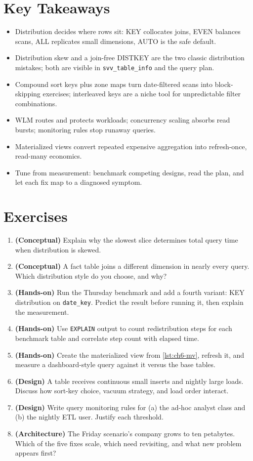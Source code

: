 \section*{Key Takeaways}
\begin{itemize}
    \item Distribution decides where rows sit: KEY collocates joins, EVEN balances scans, ALL replicates small dimensions, AUTO is the safe default.
    \item Distribution skew and a join-free DISTKEY are the two classic distribution mistakes; both are visible in \texttt{svv\_table\_info} and the query plan.
    \item Compound sort keys plus zone maps turn date-filtered scans into block-skipping exercises; interleaved keys are a niche tool for unpredictable filter combinations.
    \item WLM routes and protects workloads; concurrency scaling absorbs read bursts; monitoring rules stop runaway queries.
    \item Materialized views convert repeated expensive aggregation into refresh-once, read-many economics.
    \item Tune from measurement: benchmark competing designs, read the plan, and let each fix map to a diagnosed symptom.
\end{itemize}

\section{Exercises}
\begin{enumerate}
    \item \textbf{(Conceptual)} Explain why the slowest slice determines total query time when distribution is skewed.
    \item \textbf{(Conceptual)} A fact table joins a different dimension in nearly every query. Which distribution style do you choose, and why?
    \item \textbf{(Hands-on)} Run the Thursday benchmark and add a fourth variant: KEY distribution on \texttt{date\_key}. Predict the result before running it, then explain the measurement.
    \item \textbf{(Hands-on)} Use \texttt{EXPLAIN} output to count redistribution steps for each benchmark table and correlate step count with elapsed time.
    \item \textbf{(Hands-on)} Create the materialized view from \cref{lst:ch6-mv}, refresh it, and measure a dashboard-style query against it versus the base tables.
    \item \textbf{(Design)} A table receives continuous small inserts and nightly large loads. Discuss how sort-key choice, vacuum strategy, and load order interact.
    \item \textbf{(Design)} Write query monitoring rules for (a) the ad-hoc analyst class and (b) the nightly ETL user. Justify each threshold.
    \item \textbf{(Architecture)} The Friday scenario's company grows to ten petabytes. Which of the five fixes scale, which need revisiting, and what new problem appears first?
\end{enumerate}

